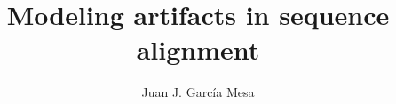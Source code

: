 

\title{Modeling artifacts in sequence alignment}
\author{Juan J. Garc\'{i}a Mesa}
\date{}


\maketitle









% 






\printbibliography


